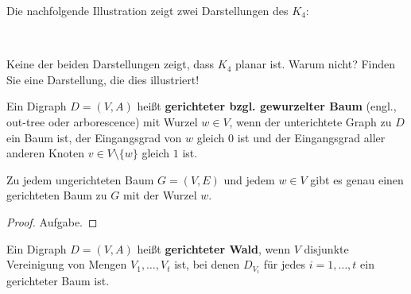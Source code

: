 \begin{bsp}
Die nachfolgende Illustration zeigt zwei Darstellungen des $K_4$:
\begin{center}
\hfill
{}
\hfill
{}
\hfill\,
\end{center}
Keine der beiden Darstellungen zeigt, dass $K_4$ planar ist.
Warum nicht?
Finden Sie eine Darstellung, die dies illustriert!
\end{bsp}

\begin{defn}
	Ein Digraph $D=(V,A)$  heißt \textbf{gerichteter bzgl. gewurzelter Baum} (engl., out-tree oder arborescence) mit Wurzel $w \in V$, wenn der unterichtete Graph zu $D$ ein Baum ist, der Eingangsgrad von $w$ gleich $0$ ist und der Eingangsgrad aller anderen Knoten $v \in V \setminus \{w\}$ gleich $1$ ist. 
\end{defn} 

\begin{prop}
	Zu jedem ungerichteten Baum $G=(V,E)$ und jedem $w \in V$ gibt es genau einen gerichteten Baum zu $G$ mit der Wurzel $w$. 
\end{prop} 
\begin{proof}
	Aufgabe. 
\end{proof} 

\begin{defn}
	Ein Digraph $D=(V,A)$ heißt \textbf{gerichteter Wald}, wenn $V$ disjunkte Vereinigung von Mengen $V_1,\ldots,V_t$ ist, bei denen $D_{V_i}$ für jedes $i=1,\ldots,t$ ein gerichteter Baum ist. 
\end{defn} 

